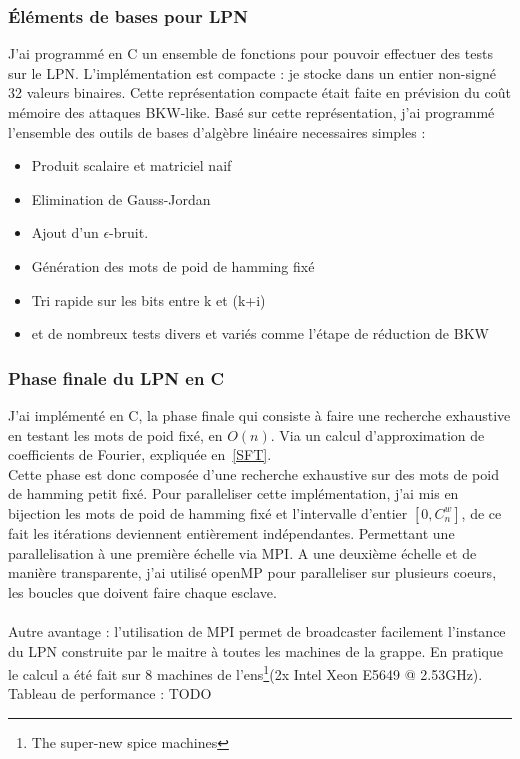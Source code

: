 \documentclass{article}		%
\begin{document}
\subsubsection{Éléments de bases pour LPN}
J'ai programmé en C un ensemble de fonctions pour pouvoir effectuer des
tests sur le LPN. L'implémentation est compacte : je stocke dans un
entier non-signé 32 valeurs binaires. Cette représentation compacte était
faite en prévision du coût mémoire des attaques BKW-like. Basé sur cette représentation, j'ai
programmé l'ensemble des outils de bases d'algèbre linéaire necessaires
simples :
\\
\begin{itemize}
\item Produit scalaire et matriciel naif 
\item Elimination de Gauss-Jordan
\item Ajout d'un $\epsilon$-bruit.
\item Génération des mots de poid de hamming fixé
\item Tri rapide sur les bits entre k et (k+i)
\item et de nombreux tests divers et variés comme l'étape de réduction de
BKW
\end{itemize}

\subsubsection{Phase finale du LPN en C}
J'ai implémenté en C, la phase finale qui consiste à faire une recherche
exhaustive en testant les mots de poid fixé, en $O(n)$. Via un calcul
d'approximation de coefficients de Fourier, expliquée en~\ref{SFT}.
\\
Cette phase est donc composée d'une recherche exhaustive sur des mots de
poid de hamming petit fixé. Pour paralleliser cette implémentation, j'ai
mis en bijection les mots de poid de hamming fixé et l'intervalle
d'entier $[0, C_{n}^{w}]$, de ce fait les itérations deviennent
entièrement indépendantes. Permettant une parallelisation à une première
échelle via MPI.
A une deuxième échelle et de manière transparente, j'ai utilisé openMP
pour paralleliser sur plusieurs coeurs, les boucles que doivent faire
chaque esclave. 
\\\\
Autre avantage : l'utilisation de MPI permet de broadcaster facilement
l'instance du LPN construite par le maitre à toutes les machines de la
grappe. En pratique le calcul a été fait sur 8 machines de
l'ens\footnote{The super-new spice machines}(2x Intel Xeon E5649 @
2.53GHz).  
Tableau de performance : TODO
\end{document}

